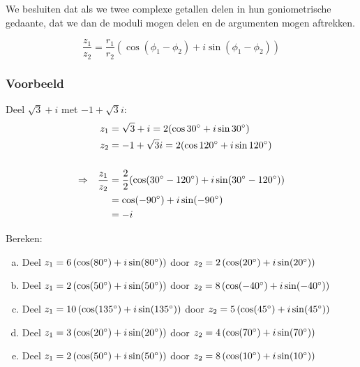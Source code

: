 \documentclass[12pt,twoside,a4paper]{article}
\begin{document}
We besluiten dat als we twee complexe getallen delen in hun goniometrische gedaante, dat we dan de moduli mogen delen en de argumenten mogen aftrekken.\\

\begin{mdframed}
  \[
    \dfrac{z_1}{z_2} = \dfrac{r_1}{r_2} \left(\cos (\phi_1 - \phi_2) + i \sin (\phi_1 - \phi_2)\right)
  \]
\end{mdframed}

\subsubsection*{Voorbeeld}

Deel $\sqrt{3} + i$ met $-1+\sqrt{3}i$:
  \begin{align*}
      &&       z_1 &= \sqrt{3} + i = 2(\cos 30^\circ + i\sin 30^\circ)\\
      &&       z_2 &= -1 + \sqrt{3}i = 2(\cos 120^\circ + i\sin 120^\circ)\\\\
    \Rightarrow && \dfrac{z_1}{z_2} &= \dfrac{2}{2} ( \cos( 30^\circ - 120^\circ ) + i\sin( 30^\circ - 120^\circ ) )\\
      &&           &= \cos(-90^\circ) + i\sin(-90^\circ)\\
      &&           &= -i
  \end{align*}

\begin{oefening}
Bereken:
\begin{enumerate}[(a)]
  \itemsep.5em
  \item Deel $z_1=6\left(\cos(80^\circ)+i\sin(80^\circ)\right)$ door $z_2=2\left(\cos(20^\circ)+i\sin(20^\circ)\right)$
  \item Deel $z_1=2\left(\cos(50^\circ)+i\sin(50^\circ)\right)$ door $z_2=8\left(\cos(-40^\circ)+i\sin(-40^\circ)\right)$
  \item Deel $z_1=10\left(\cos(135^\circ)+i\sin(135^\circ)\right)$ door $z_2=5\left(\cos(45^\circ)+i\sin(45^\circ)\right)$
  \item Deel $z_1=3\left(\cos(20^\circ)+i\sin(20^\circ)\right)$ door $z_2=4\left(\cos(70^\circ)+i\sin(70^\circ)\right)$
  \item Deel $z_1=2\left(\cos(50^\circ)+i\sin(50^\circ)\right)$ door $z_2=8\left(\cos(10^\circ)+i\sin(10^\circ)\right)$
\end{enumerate}
\end{oefening}
\end{document}
